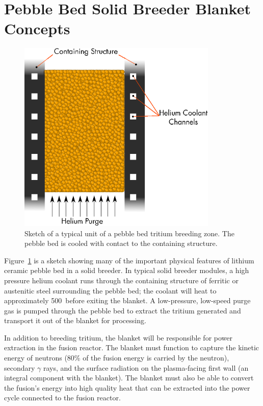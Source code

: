 \section{Pebble Bed Solid Breeder Blanket Concepts}\label{sec:blanket-design}

\begin{figure}
	\centering
	\includegraphics[width=0.85\textwidth]{chapters/figures/solid_breeder_sketch} 
	\caption{Sketch of a typical unit of a pebble bed tritium breeding zone. The pebble bed is cooled with contact to the containing structure.}
	\label{fig:solid-breeder-sketch}
\end{figure}

Figure~\ref{fig:solid-breeder-sketch} is a sketch showing many of the important physical features of lithium ceramic pebble bed in a solid breeder. In typical solid breeder modules, a high pressure helium coolant runs through the containing structure of ferritic or austenitic steel surrounding the pebble bed; the coolant will heat to approximately 500~\celsius before exiting the blanket. A low-pressure, low-speed purge gas is pumped through the pebble bed to extract the tritium generated and transport it out of the blanket for processing. 

In addition to breeding tritium, the blanket will be responsible for power extraction in the fusion reactor. The blanket must function to capture the kinetic energy of neutrons (80\% of the fusion energy is carried by the neutron), secondary $\gamma$ rays, and the surface radiation on the plasma-facing first wall (an integral component with the blanket). The blanket must also be able to convert the fusion's energy into high quality heat that can be extracted into the power cycle connected to the fusion reactor. 

